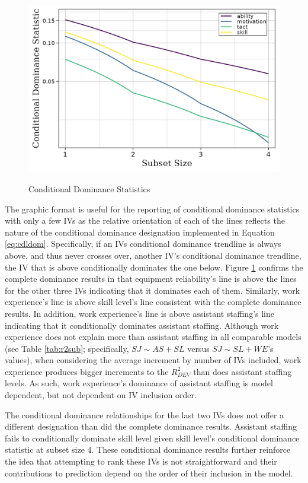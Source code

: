 \documentclass[doc]{apa7}
\begin{document}
	\begin{figure}[h!]
		\centering
		\caption{\centering Conditional Dominance Statistics}
		\includegraphics{condit_gph}
		\label{fg:cdl}
	\end{figure}

	The graphic format is useful for the reporting of conditional dominance statistics with only a few IVs as the relative orientation of each of the lines reflects the nature of the conditional dominance designation implemented in Equation \ref{eq:cdldom}.
	Specifically, if an IVs conditional dominance trendline is always above, and thus never crosses over, another IV's conditional dominance trendline, the IV that is above conditionally dominates the one below.
	Figure \ref{fg:cdl} confirms the complete dominance results in that equipment reliability's line is above the lines for the other three IVs indicating that it dominates each of them.
	Similarly, work experience's line is above skill level's line consistent with the complete dominance results.
	In addition, work experience's line is above assistant staffing's line indicating that it conditionally dominates assistant staffing.
	Although work experience does not explain more than assistant staffing in all comparable models (see Table \ref{tab:r2sub}; specifically, $SJ \sim AS + SL$ versus $SJ \sim SL + WE$'s values), when considering the average increment by number of IVs included, work experience produces bigger increments to the $R^2_{DEV}$ than does assistant staffing levels. 
	As such, work experience's dominance of assistant staffing is model dependent, but not dependent on IV inclusion order.
	
	The conditional dominance relationships for the last two IVs does not offer a different designation than did the complete dominance results.
	Assistant staffing fails to conditionally dominate skill level given skill level's conditional dominance statistic at subset size 4.
	These conditional dominance results further reinforce the idea that attempting to rank these IVs is not straightforward and their contributions to prediction depend on the order of their inclusion in the model. 
	
\end{document}
